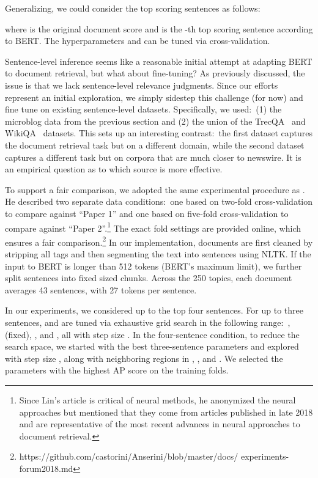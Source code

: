 \documentclass[11pt,a4paper]{article}
\begin{document}
Generalizing, we could consider the top  scoring sentences as follows:

\noindent where  is the original document score and  is the -th top scoring sentence according to BERT.
The hyperparameters  and  can be tuned via cross-validation.

Sentence-level inference seems like a reasonable initial attempt at adapting BERT to document retrieval, but what about fine-tuning?
As previously discussed, the issue is that we lack sentence-level relevance judgments.
Since our efforts represent an initial exploration, we simply sidestep this challenge (for now) and fine tune on existing sentence-level datasets.
Specifically, we used:\
(1) the microblog data from the previous section and (2) the union of the TrecQA~\cite{Yao13answerextraction} and Wiki\-QA~\cite{yang2015wikiqa} datasets.
This sets up an interesting contrast:\ the first dataset captures the document retrieval task but on a different domain, while the second dataset captures a different task but on corpora that are much closer to newswire.
It is an empirical question as to which source is more effective.

To support a fair comparison, we adopted the same experimental procedure as \citet{Lin_SIGIRForum2018}.
He described two separate data conditions:\ one based on two-fold cross-validation to compare against ``Paper 1'' and one based on five-fold cross-validation to compare against ``Paper 2''.\footnote{Since Lin's article is critical of neural methods, he anonymized the neural approaches but mentioned that they come from articles published in late 2018 and are representative of the most recent advances in neural approaches to document retrieval.}
The exact fold settings are provided online, which ensures a fair comparison.\footnote{https://github.com/castorini/Anserini/blob/master/docs/ experiments-forum2018.md}
In our implementation, documents are first cleaned by stripping all tags and then segmenting the text into sentences using NLTK.
If the input to BERT is longer than 512 tokens (BERT's maximum limit), we further split sentences into fixed sized chunks.
Across the 250 topics, each document averages 43 sentences, with 27 tokens per sentence.

In our experiments, we considered up to the top four sentences.
For up to three sentences,  and  are tuned via exhaustive grid search in the following range:\
,  (fixed), , and , all with step size .
In the four-sentence condition, to reduce the search space, we started with the best three-sentence parameters and explored  
with step size , along with neighboring regions in , , and .
We selected the parameters with the highest AP score on the training folds.
\end{document}
